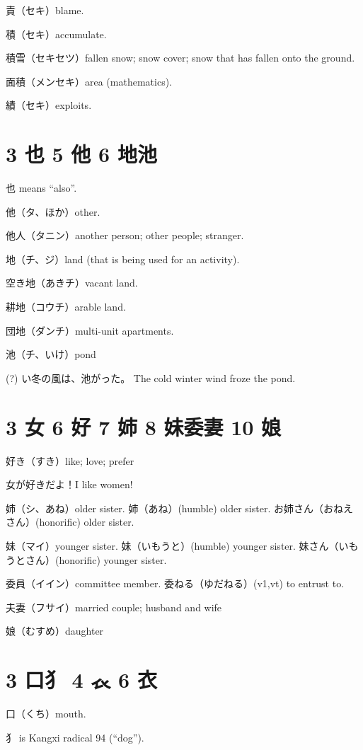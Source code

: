 責（セキ）blame.

積（セキ）accumulate.

積雪（セキセツ）fallen snow;
snow cover;
snow that has fallen onto the ground.

面積（メンセキ）area (mathematics).

績（セキ）exploits.

\section{3 也 5 他 6 地池}

也 means ``also''.

他（タ、ほか）other.

他人（タニン）another person; other people; stranger.

地（チ、ジ）land (that is being used for an activity).

空き地（あきチ）vacant land.

耕地（コウチ）arable land.

団地（ダンチ）multi-unit apartments.

池（チ、いけ）pond

(?) い冬の風は、池がった。
The cold winter wind froze the pond.

\section{3 女 6 好 7 姉 8 妹委妻 10 娘}

好き（すき）like; love; prefer

女が好きだよ！I like women!

姉（シ、あね）older sister.
姉（あね）(humble) older sister.
お姉さん（おねえさん）(honorific) older sister.

妹（マイ）younger sister.
妹（いもうと）(humble) younger sister.
妹さん（いもうとさん）(honorific) younger sister.

委員（イイン）committee member.
委ねる（ゆだねる）(v1,vt) to entrust to.

夫妻（フサイ）married couple; husband and wife

娘（むすめ）daughter

\section{3 口犭 4 𧘇 6 衣}

口（くち）mouth.

犭 is Kangxi radical 94 (``dog'').

